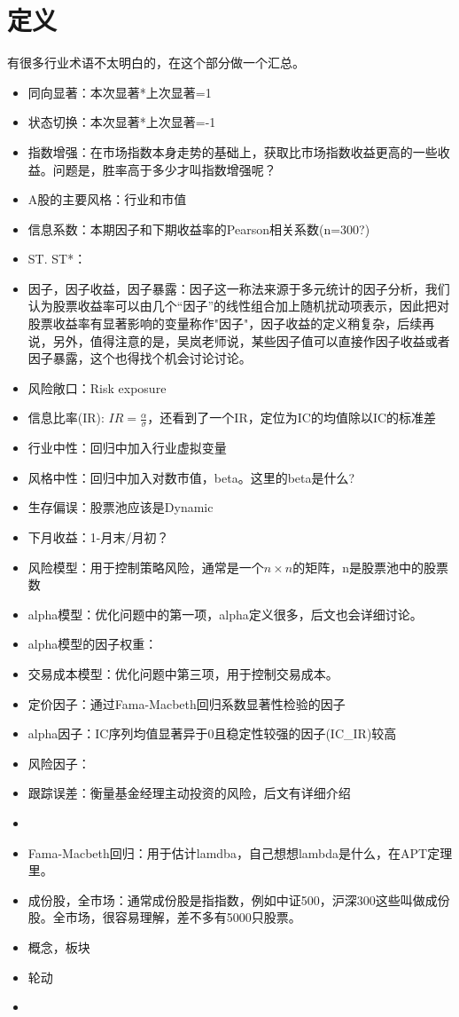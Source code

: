 \documentclass[12pt]{article}
\begin{document}
\section{定义}
有很多行业术语不太明白的，在这个部分做一个汇总。
\begin{sdefinition}{}{}
\begin{itemize}
	\item 同向显著：本次显著*上次显著=1
	\item 状态切换：本次显著*上次显著=-1
	\item 指数增强：在市场指数本身走势的基础上，获取比市场指数收益更高的一些收益。问题是，胜率高于多少才叫指数增强呢？
	\item A股的主要风格：行业和市值
	\item 信息系数：本期因子和下期收益率的Pearson相关系数(n=300?)
	\item ST. ST*：
	\item 因子，因子收益，因子暴露：因子这一称法来源于多元统计的因子分析，我们认为股票收益率可以由几个“因子”的线性组合加上随机扰动项表示，因此把对股票收益率有显著影响的变量称作"因子"，因子收益的定义稍复杂，后续再说，另外，值得注意的是，吴岚老师说，某些因子值可以直接作因子收益或者因子暴露，这个也得找个机会讨论讨论。
	\item 风险敞口：Risk exposure
	\item 信息比率(IR): $IR = \frac{\alpha}{\sigma}$，还看到了一个IR，定位为IC的均值除以IC的标准差
	\item 行业中性：回归中加入行业虚拟变量
	\item 风格中性：回归中加入对数市值，beta。这里的beta是什么?
	\item 生存偏误：股票池应该是Dynamic
	\item 下月收益：1-月末/月初？
	\item 风险模型：用于控制策略风险，通常是一个$n\times n$的矩阵，n是股票池中的股票数
	\item alpha模型：优化问题中的第一项，alpha定义很多，后文也会详细讨论。
	\item alpha模型的因子权重：
	\item 交易成本模型：优化问题中第三项，用于控制交易成本。
	\item 定价因子：通过Fama-Macbeth回归系数显著性检验的因子
	\item alpha因子：IC序列均值显著异于0且稳定性较强的因子(IC\_IR)较高
	\item 风险因子：
	\item 跟踪误差：衡量基金经理主动投资的风险，后文有详细介绍
	\item 
	\item Fama-Macbeth回归：用于估计lamdba，自己想想lambda是什么，在APT定理里。
	\item 成份股，全市场：通常成份股是指指数，例如中证500，沪深300这些叫做成份股。全市场，很容易理解，差不多有5000只股票。
	\item 概念，板块
	\item 轮动
	\item 
\end{itemize}
\end{sdefinition}
\end{document}
